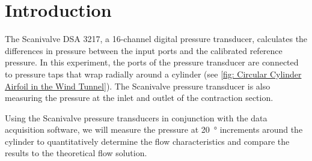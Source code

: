 \chapter{Introduction}
\label{cp:introduction}

The Scanivalve DSA 3217, a \num{16}-channel digital pressure transducer, calculates the differences in pressure between the input ports and the calibrated reference pressure. In this experiment, the ports of the pressure transducer are connected to pressure taps that wrap radially around a cylinder (see \autoref{fig: Circular Cylinder Airfoil in the Wind Tunnel}). The Scanivalve pressure transducer is also measuring the pressure at the inlet and outlet of the contraction section.

Using the Scanivalve pressure transducers in conjunction with the data acquisition software, we will measure the pressure at \qty{20}{\degree} increments around the cylinder to quantitatively determine the flow characteristics and compare the results to the theoretical flow solution.